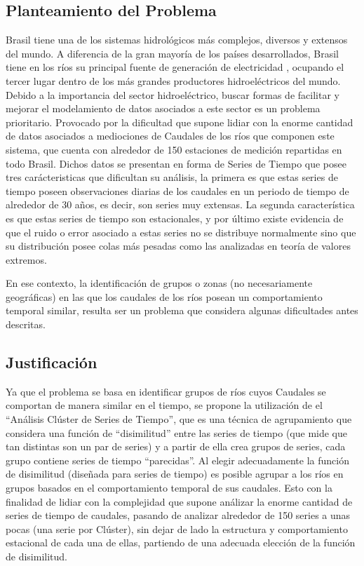 \documentclass[10pt,a4paper]{article}
\begin{document}
\subsection{Planteamiento del Problema}
Brasil tiene una de los sistemas hidrológicos más complejos, diversos y extensos del mundo. A diferencia de la gran mayoría de los países desarrollados, Brasil tiene en los ríos su principal fuente de generación de electricidad , ocupando el tercer lugar dentro de los más grandes productores hidroeléctricos del mundo. Debido a la importancia del sector hidroeléctrico, buscar formas de facilitar y mejorar el modelamiento de datos asociados a este sector es un problema prioritario. Provocado por la dificultad que supone lidiar con la enorme cantidad de datos asociados a mediociones de Caudales de los ríos que componen este sistema, que cuenta con alrededor de 150 estaciones de medición repartidas en todo Brasil. Dichos datos se presentan en forma de Series de Tiempo que posee tres carácteristicas que dificultan su análisis, la primera es que estas series de tiempo poseen observaciones diarias de los caudales en un periodo de tiempo de alrededor de 30 años, es decir, son series muy extensas. La segunda característica es que estas series de tiempo son estacionales, y por último existe evidencia de que el ruido o error asociado a estas series no se distribuye normalmente sino que su distribución posee colas más pesadas como las analizadas en teoría de valores extremos.

En ese contexto, la identificación de grupos o zonas (no necesariamente geográficas) en las que los caudales de los ríos posean un comportamiento temporal similar, resulta ser un problema que considera algunas dificultades antes descritas.



\subsection{Justificación}
Ya que el problema se basa en identificar grupos de ríos cuyos Caudales se comportan de manera similar en el tiempo, se propone la utilización de el “Análisis Clúster de Series de Tiempo”, que es una técnica de agrupamiento que considera una función de “disimilitud” entre las series de tiempo (que mide que tan distintas son un par de series) y a partir de ella crea grupos de series, cada grupo contiene series de tiempo “parecidas”. Al elegir adecuadamente la función de disimilitud (diseñada para series de tiempo) es posible agrupar a los ríos en grupos basados en el comportamiento temporal de sus caudales. Esto con la finalidad de lidiar con la complejidad que supone análizar la enorme cantidad de series de tiempo de caudales, pasando de analizar alrededor de 150 series a unas pocas (una serie por Clúster), sin dejar de lado la estructura y comportamiento estacional de cada una de ellas, partiendo de una adecuada elección de la función de disimilitud.
\end{document}
